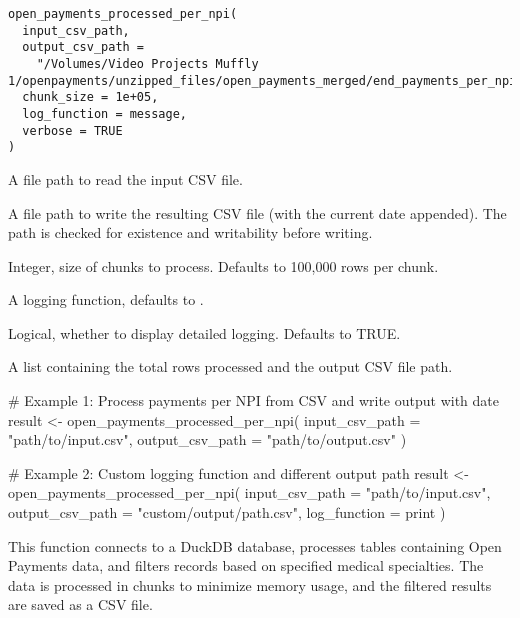 \documentclass[a4paper]{book}
\begin{document}
%
\begin{Usage}
\begin{verbatim}
open_payments_processed_per_npi(
  input_csv_path,
  output_csv_path =
    "/Volumes/Video Projects Muffly 1/openpayments/unzipped_files/open_payments_merged/end_payments_per_npi.csv",
  chunk_size = 1e+05,
  log_function = message,
  verbose = TRUE
)
\end{verbatim}
\end{Usage}
%
\begin{Arguments}
\begin{ldescription}
\item[\code{input\_csv\_path}] A file path to read the input CSV file.

\item[\code{output\_csv\_path}] A file path to write the resulting CSV file (with the current date appended).
The path is checked for existence and writability before writing.

\item[\code{chunk\_size}] Integer, size of chunks to process. Defaults to 100,000 rows per chunk.

\item[\code{log\_function}] A logging function, defaults to .

\item[\code{verbose}] Logical, whether to display detailed logging. Defaults to TRUE.
\end{ldescription}
\end{Arguments}
%
\begin{Value}
A list containing the total rows processed and the output CSV file path.
\end{Value}
%
\begin{Examples}
\begin{ExampleCode}
# Example 1: Process payments per NPI from CSV and write output with date
result <- open_payments_processed_per_npi(
  input_csv_path = "path/to/input.csv",
  output_csv_path = "path/to/output.csv"
)

# Example 2: Custom logging function and different output path
result <- open_payments_processed_per_npi(
  input_csv_path = "path/to/input.csv",
  output_csv_path = "custom/output/path.csv",
  log_function = print
)
\end{ExampleCode}
\end{Examples}
%
\begin{Description}
This function connects to a DuckDB database, processes tables containing Open Payments data, and filters records based on specified medical specialties.
The data is processed in chunks to minimize memory usage, and the filtered results are saved as a CSV file.
\end{Description}
\end{document}
